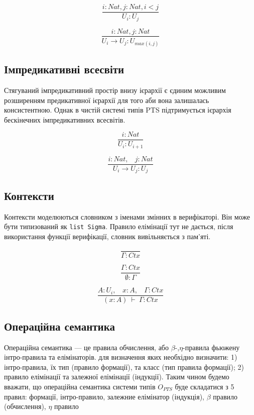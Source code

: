 \begin{definition}
\begin{definition}
\begin{definition}
\begin{definition}
\[
\tag{$A_1$}
\dfrac{i: Nat, j: Nat, i < j}{U_i : U_j}
\]

\[
\tag{$R_1$}
\dfrac{i : Nat, j : Nat}{U_i \rightarrow U_j : U_{max(i,j)} }
\]

\subsection*{Імпредикативні всесвіти}
Стягуваний імпредикативний простір внизу ієрархії є єдиним можливим розширенням
предикативної ієрархії для того аби вона залишалась консистентною. Однак
в чистій системі типів PTS підтримується ієрархія бескінечних імпредикативних всесвітів.

\begin{equation}
\tag{$A_2$}
\dfrac
{i: Nat}
{U_i : U_{i+1}}
\end{equation}

\begin{equation}
\tag{$R_2$}
\dfrac
{i : Nat,\ \ \ \ j : Nat}
{U_i \rightarrow U_{j} : U_{j}}
\end{equation}

\subsection{Контексти}

Контексти моделюються словником з іменами змінних в верифікаторі.
Він може бути типизований як \lstinline{list Sigma}.
Правило елімінації тут не дається, після використання функції верифікації,
словник вивільняється з пам'яті.

\begin{equation}
\tag{Ctx-formation}
\dfrac
{}
{\Gamma : Ctx}
\end{equation}

\begin{equation}
\tag{Ctx-intro$_1$}
\dfrac
{\Gamma : Ctx}
{\emptyset : \Gamma}
\end{equation}

\begin{equation}
\tag{Ctx-intro$_2$}
\dfrac
{A : U_i,\ \ \ \ x : A,\ \ \ \ \Gamma : Ctx}
{(x : A)\ \vdash\ \Gamma : Ctx}
\end{equation}

\newpage
\subsection{Операційна семантика}

Операційна семантика --- це правила обчислення,
або $\beta$-,$\eta$-правила фьюжену інтро-правила та елімінаторів.
для визначення яких необхідно визначити:
1) інтро-правила, їх тип (правило формації), та класс (тип правила формації);
2) правило елімінації та залежної елімінації (індукції).
Таким чином будемо вважати, що операційна семантика системи типів $O_{PTS}$
буде складатися з 5 правил: формації, інтро-правило, залежние елімінатор (індукція), $\beta$ правило (обчислення), $\eta$ правило


\end{definition}
\end{definition}
\end{definition}
\end{definition}
